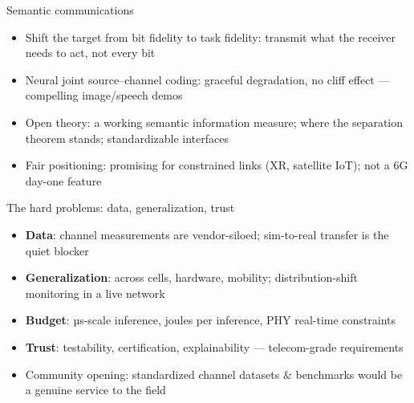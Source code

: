 \begin{frame}{Semantic communications}
  \begin{itemize}\itemsep2pt
    \item Shift the target from \alert{bit fidelity} to \alert{task fidelity}:
          transmit what the receiver needs to act, not every bit
    \item Neural joint source--channel coding: graceful degradation, no cliff
          effect --- compelling image/speech demos
    \item Open theory: a working semantic information measure; where the
          separation theorem stands; standardizable interfaces
    \item Fair positioning: promising for constrained links (XR, satellite
          IoT); not a 6G day-one feature
  \end{itemize}
\end{frame}

\begin{frame}{The hard problems: data, generalization, trust}
  \begin{itemize}\itemsep2pt
    \item \textbf{Data}: channel measurements are vendor-siloed; sim-to-real
          transfer is the quiet blocker
    \item \textbf{Generalization}: across cells, hardware, mobility;
          distribution-shift monitoring in a live network
    \item \textbf{Budget}: µs-scale inference, joules per inference, PHY
          real-time constraints
    \item \textbf{Trust}: testability, certification, explainability ---
          telecom-grade requirements
    \item Community opening: standardized channel datasets \& benchmarks would
          be a genuine service to the field
  \end{itemize}
\end{frame}

